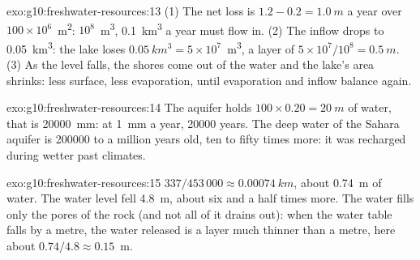 \begin{solution}{exo:g10:freshwater-resources:13}
(1) The net loss is $1.2 - 0.2 = \qty{1.0}{m}$ a year over
$100 \times 10^6$~\unit{m^2}: $10^8$~\unit{m^3}, \qty{0.1}{km^3} a year must
flow in. (2) The inflow drops to \qty{0.05}{km^3}: the lake loses
$\qty{0.05}{km^3} = 5 \times 10^7$~\unit{m^3}, a layer of
$5 \times 10^7/10^8 = \qty{0.5}{m}$. (3) As the level falls, the shores
come out of the water and the lake's area shrinks: less surface, less
evaporation, until evaporation and inflow balance again.
\end{solution}

\begin{solution}{exo:g10:freshwater-resources:14}
The aquifer holds $100 \times 0.20 = \qty{20}{m}$ of water, that is
\qty{20000}{mm}: at \qty{1}{mm} a year, \num{20000} years. The deep water of
the Sahara aquifer is \num{200000} to a million years old, ten to fifty times
more: it was recharged during wetter past climates.
\end{solution}

\begin{solution}{exo:g10:freshwater-resources:15}
$337/453\,000 \approx \qty{0.00074}{km}$, about \qty{0.74}{m} of water. The
water level fell \qty{4.8}{m}, about six and a half times more. The water
fills only the pores of the rock (and not all of it drains out): when the
water table falls by a metre, the water released is a layer much thinner than
a metre, here about $0.74/4.8 \approx \num{0.15}$~m.
\end{solution}

